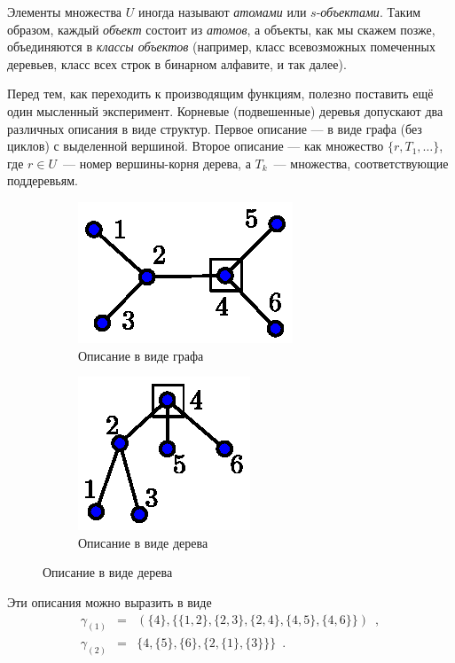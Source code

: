 \documentclass{article}
\theoremstyle{definition}
\begin{document}
Элементы множества \( U \) иногда называют \textit{атомами} или \( s 
\)-\textit{объектами}. Таким образом, каждый \textit{объект} состоит из 
\textit{атомов}, а объекты, как мы скажем позже, объединяются в \textit{классы 
объектов} (например, класс всевозможных помеченных деревьев, класс всех строк в 
бинарном алфавите, и так далее).

Перед тем, как переходить к производящим функциям, полезно 
поставить ещё один мысленный эксперимент. Корневые (подвешенные) деревья 
допускают два различных описания в виде структур. Первое описание --- в виде 
графа (без циклов) с выделенной вершиной. Второе описание --- как множество \( 
\{ r, T_1, \ldots \} \), где \( r \in U \)~--- номер вершины-корня дерева, а \( 
T_k \)~--- множества, соответствующие поддеревьям.

	\begin{figure}[h]
	\centering
    \begin{subfigure}{.5\textwidth}
    	\centering
		\includegraphics[width=.5\textwidth]{structure_isomorphism_1.eps}
		\caption{Описание в виде графа}
		\label{fig:iso_1}	
	\end{subfigure}%
    \begin{subfigure}{.34\textwidth}
		\centering
		\includegraphics[width=.5\textwidth]{structure_isomorphism_2.eps}
		\caption{Описание в виде дерева}
		\label{fig:iso_2}	
	\end{subfigure}%
    \end{figure}

Эти описания можно выразить в виде
\begin{eqnarray*}
	\gamma_{(1)} &=& (
		\{ 4 \}, \{ \{ 1,2 \}, \{2,3\}, \{2,4\}, \{4,5\}, \{4,6\} \}
	) \enspace ,\\
	\gamma_{(2)} &=& \{
		4, \{5\}, \{6\}, \{
			2, \{1\}, \{3\}
		\}
	\} \enspace .
\end{eqnarray*}
\end{document}
